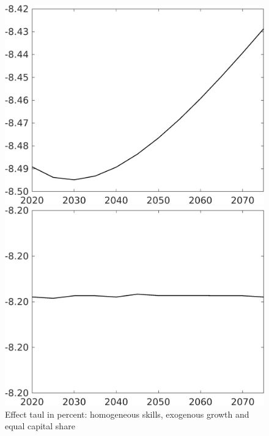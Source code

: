 \begin{figure}[h!!]
	\centering
	\caption{Effect taul in percent: homogeneous skills, exogenous growth and equal capital share }\label{fig:LF_BAU_nsk1_xgr1_equalcapShare}
	\begin{minipage}[]{0.32\textwidth}
		\includegraphics[width=1\textwidth]{../../codding_model/own_basedOnFried/optimalPol_010922_revision/figures/all_13Sept22/CompTaul_Equlab_LFBAUPer_Reg0_Emnet_spillover0_nsk1_xgr1_knspil0_sep1_countec0_GovRev1_etaa0.79.png}
	\end{minipage}	
	\begin{minipage}[]{0.32\textwidth}
		\includegraphics[width=1\textwidth]{../../codding_model/own_basedOnFried/optimalPol_010922_revision/figures/all_13Sept22/CompTaul_Equlab_LFBAUPer_Reg0_hh_spillover0_nsk1_xgr1_knspil0_sep1_countec0_GovRev1_etaa0.79.png}

\end{minipage}
\end{figure}
